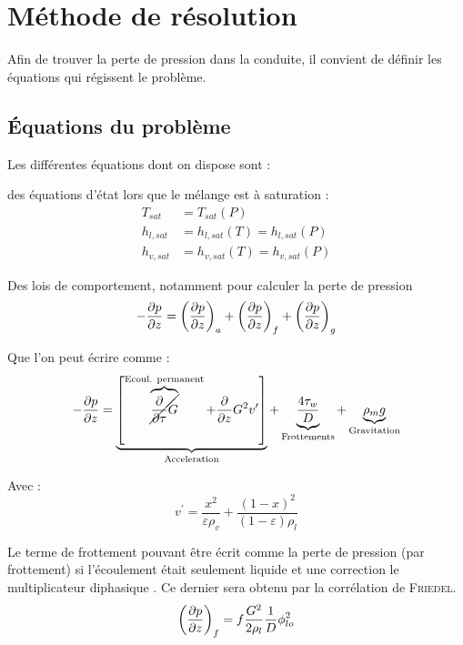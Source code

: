 \section{Méthode de résolution}
Afin de trouver la perte de pression dans la conduite, il convient de définir les équations qui régissent le problème.
\subsection{Équations du problème}
Les différentes équations dont on dispose sont :

des équations d'état lors que le mélange est à saturation :
\begin{align}
    T_{sat} &= T_{sat}(P) \\
    h_{l,sat} &= h_{l,sat}(T) = h_{l,sat}(P) \\
    h_{v,sat} &= h_{v,sat}(T) = h_{v,sat}(P)
\end{align}

Des lois de comportement, notamment pour calculer la perte de pression
\begin{equation}
     -\pder[p]{z} = \left(\pder[p]{z} \right)_{a} + \left(\pder[p]{z} \right)_{f} + \left(\pder[p]{z} \right)_{g}
\end{equation}

Que l'on peut écrire comme :
\begin{equation}
    -\pder[p]{z} = \underbrace{\left[\overbrace{\cancel{\frac{\partial}{\partial \tau} G}}^{\text{Ecoul. permanent}}+\frac{\partial}{\partial z} G^{2} v^{\prime}\right]}_{\text{Acceleration}}+\underbrace{\frac{4 \tau_{w}}{D}}_{\text{Frottements}}+\underbrace{\rho_{m} g}_{\text{Gravitation}}
\end{equation}

Avec :
\begin{equation}
    v^{\prime}=\frac{x^{2}}{\varepsilon \rho_{v}}+\frac{(1-x)^{2}}{(1-\varepsilon) \rho_{l}}
\end{equation}

Le terme de frottement pouvant être écrit comme la perte de pression (par frottement) si l'écoulement était seulement liquide et une correction le \og multiplicateur diphasique \fg{}. Ce dernier sera obtenu par la corrélation de \textsc{Friedel}.
\begin{equation}
    \left(\pder[p]{z} \right)_{f} = f\frac{G^2}{2 \rho_l}\frac{1}{D} \phi_{lo}^2
\end{equation}


